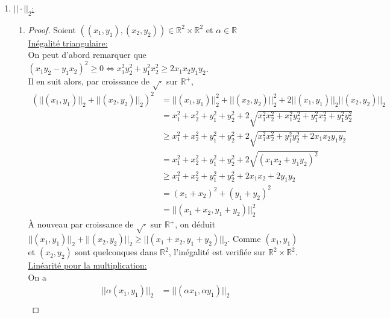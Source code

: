 \documentclass[12pt,a4paper]{scrartcl}
\newcommand{\R}{\mathbb{R}}
\begin{document}
\begin{enumerate}
	La distance $d_1$ induite par $||\cdot||_1$ est donnée par, pour tout $((x_1,y_1),(x_2,y_2)) \in \R^2 \times \R^2$, $d_1((x_1,y_1),(x_2,y_2))=||(x_2-x_1,y_2-y_1)||_1=|x_2-x_1|+|y_2-y_1|$.\\
	L'ensemble des points à égale distance de $O$ et $A$ est donné par $\{(x,y)\in \R^2:d_1(A,(x,y))=d_1(O,(x,x))\}=\{(x,y)\in \R^2:||(x-1,y-2)||_1=||(x,y)||_1\}=\{(x,y)\in \R^2:|x-1|+|y-2|=|x|+|y|\}$.\\
	De plus, l'équation (compléter par disjonction de cas sur $x>1>0, 1>x>0, 0>x $\ et\ $ y>2>0, 2>y>0, 0>y$).
	\item
	\underline{$||\cdot||_2$:}
		\begin{enumerate}
		\item \begin{proof} Soient $((x_1,y_1),(x_2,y_2)) \in \R^2 \times \R^2$ et $\alpha \in \R$\\
			\underline{Inégalité triangulaire:}\\
			On peut d'abord remarquer que $(x_1y_2-y_1x_2)^2\geq 0\iff x_1^2y_2^2+y_1^2x_2^2\geq  2x_1x_2y_1y_2$.\\
			Il en suit alors, par croissance de $\sqrt{\cdot}$ sur $\R^+$, 
			\begin{align*}
				(||(x_1,y_1)||_2+||(x_2,y_2)||_2)^2 &= ||(x_1,y_1)||_2^2+||(x_2,y_2)||_2^2+2||(x_1,y_1)||_2||(x_2,y_2)||_2\\
								    &= x_1^2+x_2^2+y_1^2+y_2^2+2\sqrt{x_1^2x_2^2+x_1^2y_2^2+y_1^2x_2^2+y_1^2y_2^2}\\
								    &\geq x_1^2+x_2^2+y_1^2+y_2^2+2\sqrt{x_1^2x_2^2+y_1^2y_2^2+2x_1x_2y_1y_2}\\
								    &= x_1^2+x_2^2+y_1^2+y_2^2+2\sqrt{(x_1x_2+y_1y_2)^2}\\
								    &\geq x_1^2+x_2^2+y_1^2+y_2^2+2x_1x_2+2y_1y_2\\
								    &= (x_1+x_2)^2+(y_1+y_2)^2\\
								    &= ||(x_1+x_2,y_1+y_2)||_2^2
			\end{align*}
			À nouveau par croissance de $\sqrt{\cdot}$ sur $\R^+$, on déduit $||(x_1,y_1)||_2+||(x_2,y_2)||_2 \geq ||(x_1+x_2,y_1+y_2)||_2$.
			Comme $(x_1,y_1)$ et $(x_2,y_2)$ sont quelconques dans $\R^2$, l'inégalité est verifiée sur $\R^2 \times \R^2$.\\
			\underline{Linéarité pour la multiplication:}\\
			On a 
			\begin{align*}
				||\alpha(x_1,y_1)||_2 &= ||(\alpha x_1,\alpha y_1)||_2\\

\end{align*}
\end{proof}
\end{enumerate}
\end{enumerate}
\end{document}
